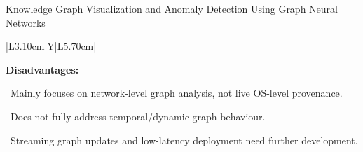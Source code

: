 \begin{frame}[t]{Knowledge Graph Visualization and Anomaly Detection Using Graph Neural Networks}
{\begin{tabularx}{\textwidth}{|L{3.10cm}|Y|L{5.70cm}|}
\begin{minipage}[t]{\linewidth}
\textcolor{limitRed}{\textbf{Disadvantages:}}\par\vspace{1.3pt}
\textbullet~Mainly focuses on network-level graph analysis, not live OS-level provenance.\par\vspace{1.8pt}\textbullet~Does not fully address temporal/dynamic graph behaviour.\par\vspace{1.8pt}\textbullet~Streaming graph updates and low-latency deployment need further development.\par\vspace{3pt}
\end{minipage} \\\hline
\end{tabularx}}
\end{frame}

